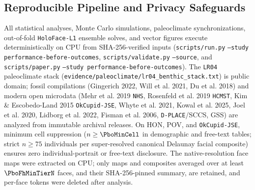 \subsection{Reproducible Pipeline and Privacy Safeguards}
All statistical analyses, Monte Carlo simulations, paleoclimate synchronizations, out-of-fold \texttt{HoloFace-L1} ensemble solves, and vector figures execute deterministically on CPU from SHA-256-verified inputs (\nolinkurl{scripts/run.py} \texttt{--study performance-before-outcomes}, \nolinkurl{scripts/validate.py} \texttt{--source}, and \nolinkurl{scripts/paper.py} \texttt{--study performance-before-outcomes}). The \texttt{LR04} paleoclimate stack (\nolinkurl{evidence/paleoclimate/lr04_benthic_stack.txt}) is public domain; fossil compilations (Gingerich 2022, Will et al. 2021, Du et al. 2018) and modern open microdata (Mehr et al. 2019 \texttt{NHS}, Rosenfeld et al. 2019 \texttt{HCMST}, Kim \& Escobedo-Land 2015 \texttt{OkCupid-JSE}, Whyte et al. 2021, Kowal et al. 2025, Joel et al. 2020, Lidborg et al. 2022, Fisman et al. 2006, \texttt{D-PLACE}/SCCS, GSS) are analyzed from immutable archival releases. On HON, POV, and \texttt{OkCupid-JSE}, minimum cell suppression ($n\ge\PboMinCell$ in demographic and free-text tables; strict $n\ge 75$ individuals per super-resolved canonical Delaunay facial composite) ensures zero individual-portrait or free-text disclosure. The native-resolution face maps were extracted on CPU; only maps and composites averaged over at least $\PboFhMinTierN$ faces, and their SHA-256-pinned summary, are retained, and per-face tokens were deleted after analysis.
